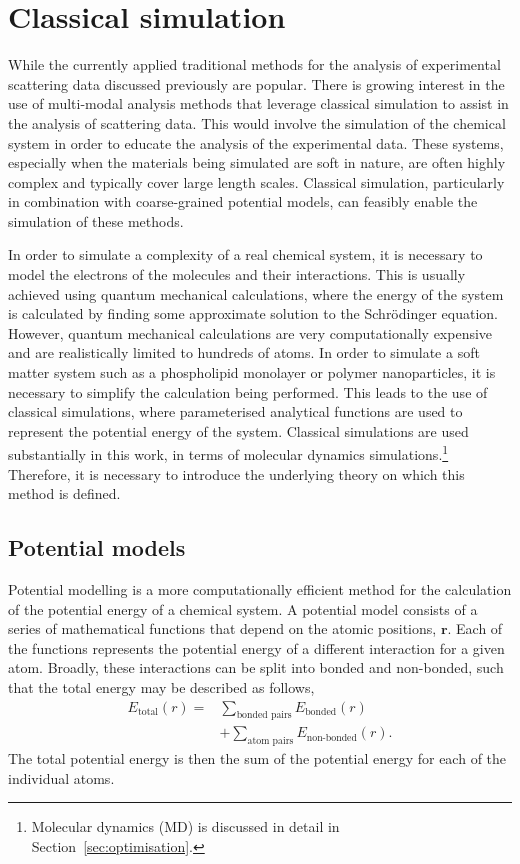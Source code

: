 \section{Classical simulation}
\label{sec:classical}
While the currently applied traditional methods for the analysis of experimental scattering data discussed previously are popular.
There is growing interest in the use of multi-modal analysis methods that leverage classical simulation to assist in the analysis of scattering data.\autocite{ivanovic_temperature-dependent_2018,scoppola_combining_2018,dabkowska_modulation_2014,hub_interpreting_2018}
This would involve the simulation of the chemical system in order to educate the analysis of the experimental data.
These systems, especially when the materials being simulated are soft in nature, are often highly complex and typically cover large length scales.
Classical simulation, particularly in combination with coarse-grained potential models, can feasibly enable the simulation of these methods.

In order to simulate a complexity of a real chemical system, it is necessary to model the electrons of the molecules and their interactions.
This is usually achieved using quantum mechanical calculations, where the energy of the system is calculated by finding some approximate solution to the Schr\"{o}dinger equation.
However, quantum mechanical calculations are very computationally expensive and are realistically limited to hundreds of atoms.
In order to simulate a soft matter system such as a phospholipid monolayer or polymer nanoparticles, it is necessary to simplify the calculation being performed.
This leads to the use of classical simulations, where parameterised analytical functions are used to represent the potential energy of the system.
Classical simulations are used substantially in this work, in terms of molecular dynamics simulations.\footnote{Molecular dynamics (MD) is discussed in detail in Section~\ref{sec:optimisation}.}
Therefore, it is necessary to introduce the underlying theory on which this method is defined.

\subsection{Potential models}
\label{sec:potentmodels}
Potential modelling is a more computationally efficient method for the calculation of the potential energy of a chemical system.
A potential model consists of a series of mathematical functions that depend on the atomic positions, $\mathbf{r}$.
Each of the functions represents the potential energy of a different interaction for a given atom.
Broadly, these interactions can be split into bonded and non-bonded, such that the total energy may be described as follows,
%
\begin{equation}
\begin{aligned}
  E_{\text{total}}(r) = & \sum_{\text{bonded pairs}}{E_{\text{bonded}}(r)} \\
  & + \sum_{\text{atom pairs}}{E_{\text{non-bonded}}(r)}.
\end{aligned}
\end{equation}
%
The total potential energy is then the sum of the potential energy for each of the individual atoms.

